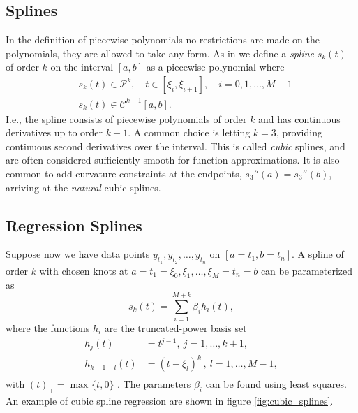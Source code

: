 \documentclass[a4paper]{memoir}
\theoremstyle{plain}
\theoremstyle{definition}
\theoremstyle{remark}
\begin{document}
\subsection{Splines}
In the definition of piecewise polynomials no restrictions are made on the polynomials, they are allowed to take any form.
As in \cite{quarteroni} we define a \textit{spline} $s_k(t)$ of order $k$ on the interval $[a,b]$ as a piecewise polynomial where
\begin{align*}
        &s_k(t) \in \mathcal{P}^k , \quad t \in [\xi_i, \xi_{i+1}],\quad i = 0, 1, \hdots, M-1 \\
        &s_k(t) \in \mathcal{C}^{k - 1}[a, b].
\end{align*}
I.e., the spline consists of piecewise polynomials of order $k$ and has continuous derivatives up to order $k - 1$.
A common choice is letting $k = 3$, providing continuous second derivatives over the interval.
This is called \textit{cubic} splines, and are often considered sufficiently smooth for function approximations.
It is also common to add curvature constraints at the endpoints, $s_3''(a) = s_3''(b)$, arriving at the \textit{natural} cubic splines.

\subsection{Regression Splines}
Suppose now we have data points $y_{t_1}, y_{t_2}, \hdots, y_{t_n}$ on $[a = t_1, b = t_n]$. 
A spline of order $k$ with chosen knots at $a = t_1 = \xi_0, \xi_1, \hdots, \xi_{M} = t_n = b$ can be parameterized as 
\begin{equation}\label{eq:lsq_spline}
        s_k(t) = \sum_{i = 1}^{M + k} \beta_i h_i(t),
\end{equation}
where the functions $h_i$ are the truncated-power basis set
\begin{align*}
        h_j(t) &= t^{j - 1}, \ j = 1, \hdots, k+1, \\
        h_{k+1+l}(t) &= (t - \xi_l)_+^k, \ l = 1, \hdots, M-1,
\end{align*}
with $(t)_+ = \max_{} \{ t, 0 \}$ \cite{hastie}.
The parameters $\beta_i$ can be found using least squares.
An example of cubic spline regression are shown in figure \ref{fig:cubic_splines}.
\end{document}
